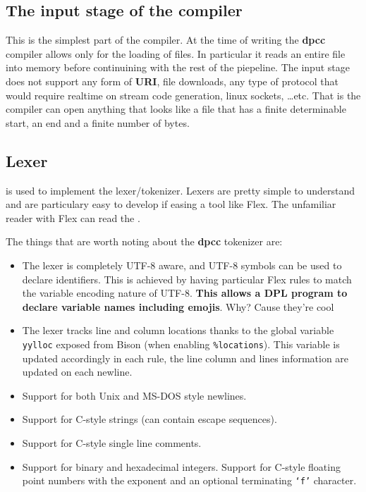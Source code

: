 \documentclass[a4paper]{article}
\newcommand{\urlref}[3][blue]{\href{#2}{\color{#1}{#3}}}%
\begin{document}
\subsection{The input stage of the compiler}
This is the simplest part of the compiler. At the time of writing the \textbf{dpcc} compiler
allows only for the loading of files. In particular it reads an entire file into memory before continuining
with the rest of the piepeline. The input stage does not support any form of \textbf{URI}, file downloads, any type of protocol
that would require realtime on stream code generation, linux sockets, \dots etc. That is the
compiler can open anything that looks like a file that has a finite determinable start, an end
and a finite number of bytes.

\subsection{Lexer}

\urlref{https://github.com/westes/flex/}{Flex} is used to implement the lexer/tokenizer. Lexers are pretty simple to understand and
are particulary easy to develop if easing a tool like Flex. The unfamiliar reader with Flex can read the \urlref{https://www.cs.virginia.edu/~cr4bd/flex-manual/}{Flex Manual}.

The things that are worth noting about the \textbf{dpcc} tokenizer are:

\begin{itemize}
\item The lexer is completely UTF-8 aware, and UTF-8 symbols can be used to declare identifiers. This is achieved
    by having particular Flex rules to match the variable encoding nature of UTF-8.
    \textbf{This allows a DPL program to declare variable names including emojis}. Why? Cause they're cool \smiley
\item The lexer tracks line and column locations thanks to the global variable \texttt{yylloc} exposed from Bison (when enabling \texttt{\%locations}).
    This variable is updated accordingly in each rule, the line column and lines information are updated on each newline.
\item Support for both Unix and MS-DOS style newlines.
\item Support for C-style strings (can contain escape sequences).
\item Support for C-style single line comments.
\item Support for binary and hexadecimal integers. Support for C-style floating point numbers with the exponent and an optional terminating \texttt{`f'} character.
\end{itemize}
\end{document}
